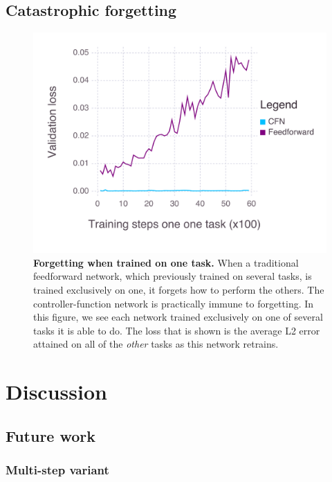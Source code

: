 \documentclass[12pt,twoside]{mitthesis}
\begin{document}
\subsection{Catastrophic forgetting}\label{catastrophic-forgetting-1}

\begin{figure}[htbp]
\centering
\includegraphics{../figures/forgetting.png}
\caption{\label{fig:forgetting}\textbf{Forgetting when trained on one
task.} When a traditional feedforward network, which previously trained
on several tasks, is trained exclusively on one, it forgets how to
perform the others. The controller-function network is practically
immune to forgetting. In this figure, we see each network trained
exclusively on one of several tasks it is able to do. The loss that is
shown is the average L2 error attained on all of the \emph{other} tasks
as this network retrains.}
\end{figure}

\section{Discussion}\label{discussion-1}

\subsection{Future work}\label{future-work}

\subsubsection{Multi-step variant}\label{sec:multistep}
\end{document}
